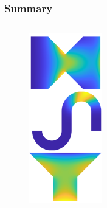 \documentclass[aspectratio=169,xcolor=dvipsnames]{beamer}
\begin{document}
\begin{frame}
	\frametitle{Summary}
	\begin{columns}
		\vspace{-0.5cm}
		\begin{figure}
			\includegraphics[width=3.2cm]{Current.png}
		\end{figure}
		

\end{columns}
\end{frame}
\end{document}
